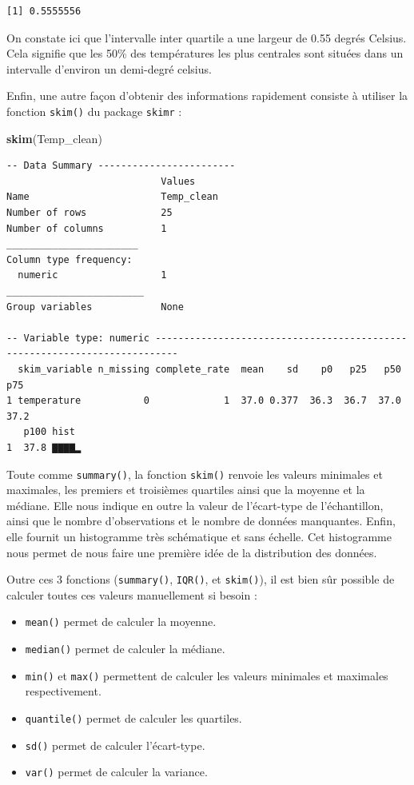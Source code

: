 \documentclass[a4paperpaper,]{article}
\newenvironment{Shaded}{\begin{snugshade}}{\end{snugshade}}
\newcommand{\KeywordTok}[1]{\textcolor[rgb]{0.12,0.11,0.11}{\textbf{#1}}}
\newcommand{\NormalTok}[1]{\textcolor[rgb]{0.12,0.11,0.11}{#1}}
\providecommand{\tightlist}{%
  \setlength{\itemsep}{0pt}\setlength{\parskip}{0pt}}
\begin{document}
\begin{verbatim}
[1] 0.5555556
\end{verbatim}

On constate ici que l'intervalle inter quartile a une largeur de 0.55 degrés Celsius. Cela signifie que les 50\% des températures les plus centrales sont situées dans un intervalle d'environ un demi-degré celsius.

Enfin, une autre façon d'obtenir des informations rapidement consiste à utiliser la fonction \texttt{skim()} du package \texttt{skimr} :

\begin{Shaded}
\begin{Highlighting}[]
\KeywordTok{skim}\NormalTok{(Temp_clean)}
\end{Highlighting}
\end{Shaded}

\begin{verbatim}
-- Data Summary ------------------------
                           Values    
Name                       Temp_clean
Number of rows             25        
Number of columns          1         
_______________________              
Column type frequency:               
  numeric                  1         
________________________             
Group variables            None      

-- Variable type: numeric --------------------------------------------------------------------------
  skim_variable n_missing complete_rate  mean    sd    p0   p25   p50   p75
1 temperature           0             1  37.0 0.377  36.3  36.7  37.0  37.2
   p100 hist 
1  37.8 ▇▇▇▇▂
\end{verbatim}

Toute comme \texttt{summary()}, la fonction \texttt{skim()} renvoie les valeurs minimales et maximales, les premiers et troisièmes quartiles ainsi que la moyenne et la médiane. Elle nous indique en outre la valeur de l'écart-type de l'échantillon, ainsi que le nombre d'observations et le nombre de données manquantes. Enfin, elle fournit un histogramme très schématique et sans échelle. Cet histogramme nous permet de nous faire une première idée de la distribution des données.

Outre ces 3 fonctions (\texttt{summary()}, \texttt{IQR()}, et \texttt{skim()}), il est bien sûr possible de calculer toutes ces valeurs manuellement si besoin :

\begin{itemize}
\tightlist
\item
  \texttt{mean()} permet de calculer la moyenne.
\item
  \texttt{median()} permet de calculer la médiane.
\item
  \texttt{min()} et \texttt{max()} permettent de calculer les valeurs minimales et maximales respectivement.
\item
  \texttt{quantile()} permet de calculer les quartiles.
\item
  \texttt{sd()} permet de calculer l'écart-type.
\item
  \texttt{var()} permet de calculer la variance.
\end{itemize}
\end{document}
